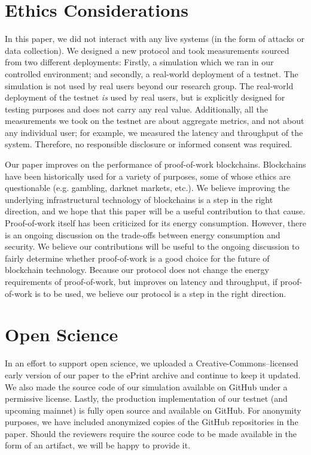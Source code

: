 \section{Ethics Considerations}

In this paper, we did not interact with any live systems (in the form of attacks or data collection).
We designed a new protocol and took measurements sourced from two different deployments: Firstly,
a simulation which we ran in our controlled environment; and secondly, a real-world deployment of
a testnet. The simulation is not used by real users beyond our research group. The real-world deployment
of the testnet \emph{is} used by real users, but is explicitly designed for testing purposes and does
not carry any real value. Additionally, all the measurements we took on the testnet are about aggregate
metrics, and not about any individual user; for example, we measured the latency and throughput of the
system. Therefore, no responsible disclosure or informed consent was required.

Our paper improves on the performance of proof-of-work blockchains. Blockchains have been historically used
for a variety of purposes, some of whose ethics are questionable (e.g. gambling, darknet markets, etc.).
We believe improving the underlying infrastructural technology of blockchains is a step in the right direction,
and we hope that this paper will be a useful contribution to that cause. Proof-of-work itself has been criticized
for its energy consumption. However, there is an ongoing discussion on the trade-offs between energy consumption
and security. We believe our contributions will be useful to the ongoing discussion to fairly determine whether
proof-of-work is a good choice for the future of blockchain technology. Because our protocol does not change the
energy requirements of proof-of-work, but improves on latency and throughput, if proof-of-work is to be used,
we believe our protocol is a step in the right direction.

\section{Open Science}

In an effort to support open science, we uploaded a Creative-Commons--licensed early version of our paper to the
ePrint archive and continue to keep it updated. We also made the source code of our simulation available on
GitHub under a permissive license. Lastly, the production implementation of our testnet (and upcoming mainnet)
is fully open source and available on GitHub. For anonymity purposes, we have included anonymized copies of
the GitHub repositories in the paper. Should the reviewers require the source code to be made available in
the form of an artifact, we will be happy to provide it.
